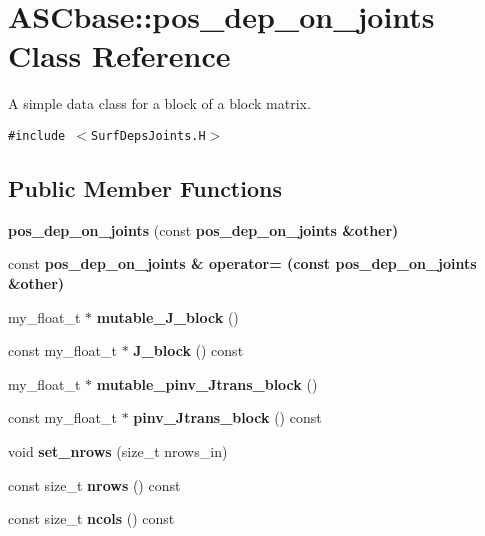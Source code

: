 \section{ASCbase::pos\_\-dep\_\-on\_\-joints Class Reference}
\label{classASCbase_1_1pos__dep__on__joints}
A simple data class for a block of a block matrix.  


{\tt \#include $<$Surf\-Deps\-Joints.H$>$}

\subsection*{Public Member Functions}
\begin{CompactItemize}
\item 
\textbf{pos\_\-dep\_\-on\_\-joints} (const \bf{pos\_\-dep\_\-on\_\-joints} \&other)\label{classASCbase_1_1pos__dep__on__joints_a4d2e825eaa2ae2553a8d7f2d66ed89f}

\item 
const \bf{pos\_\-dep\_\-on\_\-joints} \& \textbf{operator=} (const \bf{pos\_\-dep\_\-on\_\-joints} \&other)\label{classASCbase_1_1pos__dep__on__joints_39042623fb7f7515fcd7d32bd90650d7}

\item 
my\_\-float\_\-t $\ast$ \textbf{mutable\_\-J\_\-block} ()\label{classASCbase_1_1pos__dep__on__joints_85b245396b5836c8d29c4416fbea415e}

\item 
const my\_\-float\_\-t $\ast$ \textbf{J\_\-block} () const \label{classASCbase_1_1pos__dep__on__joints_9ee419794ff9722634571b40d782db0b}

\item 
my\_\-float\_\-t $\ast$ \textbf{mutable\_\-pinv\_\-Jtrans\_\-block} ()\label{classASCbase_1_1pos__dep__on__joints_3fca56953be29994e0ccbdbfbbc10e3d}

\item 
const my\_\-float\_\-t $\ast$ \textbf{pinv\_\-Jtrans\_\-block} () const \label{classASCbase_1_1pos__dep__on__joints_872dca61f0aab268dc6e1e6410839d4f}

\item 
void \textbf{set\_\-nrows} (size\_\-t nrows\_\-in)\label{classASCbase_1_1pos__dep__on__joints_8f0c3af5f80ff453a25725814fe066fb}

\item 
const size\_\-t \textbf{nrows} () const \label{classASCbase_1_1pos__dep__on__joints_cd80bf7a3eec0bf71a98096e781ea4f3}

\item 
const size\_\-t \textbf{ncols} () const \label{classASCbase_1_1pos__dep__on__joints_e7b83cb4f3741807ad2d3d18d3a54ec4}

\end{CompactItemize}

